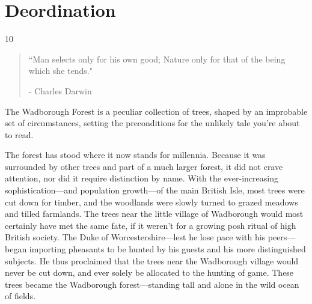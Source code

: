 \chapter{Deordination}

\vspace{-1.3cm}
\begin{localsize}{10}
	\begin{quote}
		``Man selects only for his own good; Nature only for that of the being which she tends."
		\begin{flushright}- Charles Darwin\end{flushright}
	\end{quote} 
\end{localsize}
\vspace{1cm}

The Wadborough Forest is a peculiar collection of trees, shaped by an improbable set of circumstances, setting the preconditions for the unlikely tale you're about to read. %

The forest has stood where it now stands for millennia.
Because it was surrounded by other trees and part of a much larger forest, it did not crave attention, nor did it require distinction by name.
With the ever-increasing sophistication---and population growth---of the main British Isle, most trees were cut down for timber, and the woodlands were slowly turned to grazed meadows and tilled farmlands. The trees near the little village of Wadborough would most certainly have met the same fate, if it weren't for a growing posh ritual of high British society.
The Duke of Worcestershire---lest he lose pace with his peers---began importing pheasants to be hunted by his guests and his more distinguished subjects.
He thus proclaimed that the trees near the Wadborough village would never be cut down, and ever solely be allocated to the hunting of game. These trees became the Wadborough forest---standing tall and alone in the wild ocean of fields.

